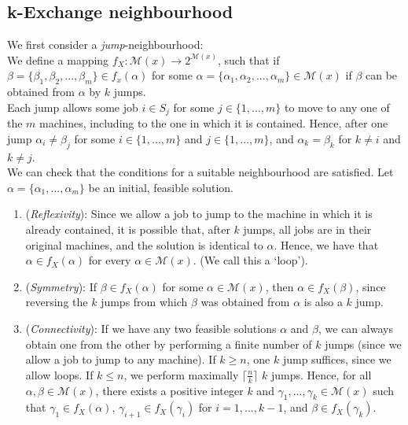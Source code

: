 \documentclass[12pt,a4paper,leqno]{article}
\begin{document}
\subsection*{k-Exchange neighbourhood}

We first consider a \textit{jump}-neighbourhood: \\

We define a mapping $f_X: \mathcal{M}(x) \rightarrow 2^{\mathcal{M}(x)}$, such that if $\beta = \{\beta_1,\beta_2,...,\beta_m \} \in f_x(\alpha)$ for some $\alpha = \{\alpha_1,\alpha_2,...,\alpha_m \} \in \mathcal{M}(x)$ if $\beta$ can be obtained from $\alpha$ by $k$ jumps. \\

Each jump allows some job $i \in S_j$ for some $j \in \{1,...,m\}$ to move to any one of the $m$ machines, including to the one in which it is contained. Hence, after one jump $\alpha_i \neq \beta_j$ for some $i \in \{1,...,m\}$ and $j \in \{1,...,m\}$, and $\alpha_k = \beta_k$ for $k \neq i$ and $k \neq j$. \\

We can check that the conditions for a suitable neighbourhood are satisfied. Let $\alpha = \{\alpha_1,...,\alpha_m\}$ be an initial, feasible solution.
\begin{enumerate}

\item (\textit{Reflexivity}): Since we allow a job to jump to the machine in which it is already contained, it is possible that, after $k$ jumps, all jobs are in their original machines, and the solution is identical to $\alpha$. Hence, we have that $\alpha \in f_X(\alpha)$ for every $\alpha \in \mathcal{M}(x)$. (We call this a `loop').

\item (\textit{Symmetry}): If $\beta \in f_X(\alpha)$ for some $\alpha \in \mathcal{M}(x)$, then $\alpha \in f_X(\beta)$, since reversing the $k$ jumps from which $\beta$ was obtained from $\alpha$ is also a $k$ jump. 

\item (\textit{Connectivity}): If we have any two feasible solutions $\alpha$ and $\beta$, we can always obtain one from the other by performing a finite number of $k$ jumps (since we allow a job to jump to any machine). If $k \geq n$, one $k$ jump suffices, since we allow loops. If $k \leq n$, we perform maximally $\lceil \frac{n}{k} \rceil$ $k$ jumps. Hence, for all $\alpha, \beta \in \mathcal{M}(x)$, there exists a positive integer $k$ and $\gamma_1,...,\gamma_k \in \mathcal{M}(x)$ such that $\gamma_1 \in f_X(\alpha)$, $\gamma_{i+1} \in f_X(\gamma_i)$ for $i=1,...,k-1$, and $\beta \in f_X(\gamma_k)$. 

\end{enumerate}
\end{document}

